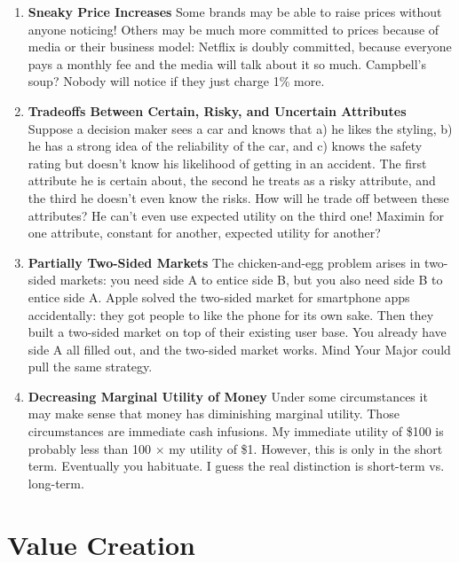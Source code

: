 \documentclass[paper=a4, fontsize=11pt]{scrartcl} %
\numberwithin{equation}{section} %
\numberwithin{figure}{section} %
\numberwithin{table}{section} %
\begin{document}
\begin{enumerate}
\item \textbf{Sneaky Price Increases}  Some brands may be able to raise prices without anyone noticing!  Others may be much more committed to prices because of media or their business model: Netflix is doubly committed, because everyone pays a monthly fee and the media will talk about it so much.  Campbell's soup?  Nobody will notice if they just charge 1\% more.

\item \textbf{Tradeoffs Between Certain, Risky, and Uncertain Attributes} Suppose a decision maker sees a car and knows that a) he likes the styling, b) he has a strong idea of the reliability of the car, and c) knows the safety rating but doesn't know his likelihood of getting in an accident.  The first attribute he is certain about, the second he treats as a risky attribute, and the third he doesn't even know the risks.  How will he trade off between these attributes?  He can't even use expected utility on the third one!  Maximin for one attribute, constant for another, expected utility for another?

\item \textbf{Partially Two-Sided Markets} The chicken-and-egg problem arises in two-sided markets: you need side A to entice side B, but you also need side B to entice side A.  Apple solved the two-sided market for smartphone apps accidentally: they got people to like the phone for its own sake.  Then they built a two-sided market on top of their existing user base.  You already have side A all filled out, and the two-sided market works.  Mind Your Major could pull the same strategy.

\item \textbf{Decreasing Marginal Utility of Money}  Under some circumstances it may make sense that money has diminishing marginal utility.  Those circumstances are immediate cash infusions.  My immediate utility of \$100 is probably less than 100 $\times$ my utility of \$1.  However, this is only in the short term.  Eventually you habituate.  I guess the real distinction is short-term vs. long-term.  

\end{enumerate}



\section{Value Creation}
\end{document}
